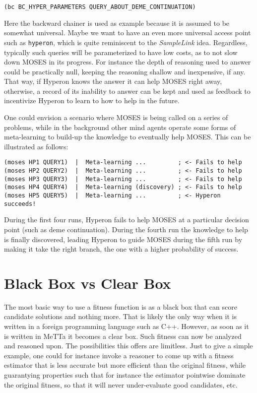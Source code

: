 \documentclass[]{report}
\begin{document}
\begin{verbatim}
(bc BC_HYPER_PARAMETERS QUERY_ABOUT_DEME_CONTINUATION)
\end{verbatim}
Here the backward chainer is used as example because it is assumed to
be somewhat universal.  Maybe we want to have an even more universal
access point such as \texttt{hyperon}, which is quite
reminiscent to the \emph{SampleLink} idea.  Regardless, typically such
queries will be parameterized to have low costs, as to not slow down
MOSES in its progress.  For instance the depth of reasoning used to
answer could be practically null, keeping the reasoning shallow and
inexpensive, if any.  That way, if Hyperon knows the answer it can
help MOSES right away, otherwise, a record of its inability to answer
can be kept and used as feedback to incentivize Hyperon to learn to
how to help in the future.

One could envision a scenario where MOSES is being called on a series
of problems, while in the background other mind agents operate some
forms of meta-learning to build-up the knowledge to eventually help
MOSES.  This can be illustrated as follows:

{\small
\begin{verbatim}
(moses HP1 QUERY1)  |  Meta-learning ...         ; <- Fails to help
(moses HP2 QUERY2)  |  Meta-learning ...         ; <- Fails to help
(moses HP3 QUERY3)  |  Meta-learning ...         ; <- Fails to help
(moses HP4 QUERY4)  |  Meta-learning (discovery) ; <- Fails to help
(moses HP5 QUERY5)  |  Meta-learning ...         ; <- Hyperon succeeds!
\end{verbatim}
} During the first four runs, Hyperon fails to help MOSES at a
particular decision point (such as deme continuation).  During the
fourth run the knowledge to help is finally discovered, leading
Hyperon to guide MOSES during the fifth run by making it take the
right branch, the one with a higher probability of success.

\section{Black Box vs Clear Box}
\label{sec:blackbox-clearbox}

The most basic way to use a fitness function is as a black box that
can score candidate solutions and nothing more.  That is likely the
only way when it is written in a foreign programming language such as
C++.  However, as soon as it is written in MeTTa it becomes a clear
box.  Such fitness can now be analyzed and reasoned upon.  The
possibilities this offers are limitless.  Just to give a simple
example, one could for instance invoke a reasoner to come up with a
fitness estimator that is less accurate but more efficient than the
original fitness, while guarantying properties such that for instance
the estimator pointwise dominate the original fitness, so that it will
never under-evaluate good candidates, etc.
\end{document}

